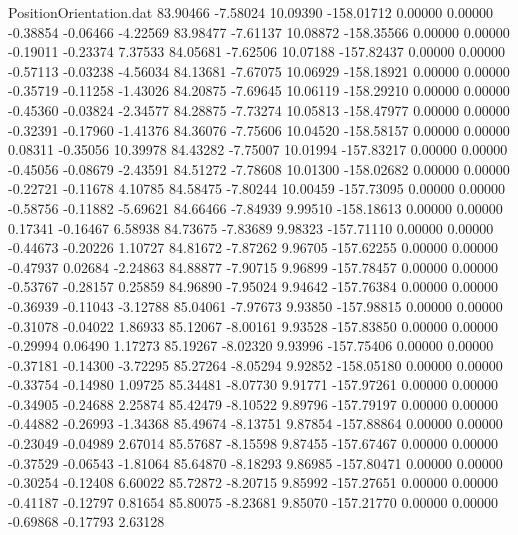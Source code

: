 \begin{filecontents}{PositionOrientation.dat}
  83.90466   -7.58024   10.09390  -158.01712    0.00000    0.00000   -0.38854   -0.06466   -4.22569
  83.98477   -7.61137   10.08872  -158.35566    0.00000    0.00000   -0.19011   -0.23374    7.37533
  84.05681   -7.62506   10.07188  -157.82437    0.00000    0.00000   -0.57113   -0.03238   -4.56034
  84.13681   -7.67075   10.06929  -158.18921    0.00000    0.00000   -0.35719   -0.11258   -1.43026
  84.20875   -7.69645   10.06119  -158.29210    0.00000    0.00000   -0.45360   -0.03824   -2.34577
  84.28875   -7.73274   10.05813  -158.47977    0.00000    0.00000   -0.32391   -0.17960   -1.41376
  84.36076   -7.75606   10.04520  -158.58157    0.00000    0.00000    0.08311   -0.35056   10.39978
  84.43282   -7.75007   10.01994  -157.83217    0.00000    0.00000   -0.45056   -0.08679   -2.43591
  84.51272   -7.78608   10.01300  -158.02682    0.00000    0.00000   -0.22721   -0.11678    4.10785
  84.58475   -7.80244   10.00459  -157.73095    0.00000    0.00000   -0.58756   -0.11882   -5.69621
  84.66466   -7.84939    9.99510  -158.18613    0.00000    0.00000    0.17341   -0.16467    6.58938
  84.73675   -7.83689    9.98323  -157.71110    0.00000    0.00000   -0.44673   -0.20226    1.10727
  84.81672   -7.87262    9.96705  -157.62255    0.00000    0.00000   -0.47937    0.02684   -2.24863
  84.88877   -7.90715    9.96899  -157.78457    0.00000    0.00000   -0.53767   -0.28157    0.25859
  84.96890   -7.95024    9.94642  -157.76384    0.00000    0.00000   -0.36939   -0.11043   -3.12788
  85.04061   -7.97673    9.93850  -157.98815    0.00000    0.00000   -0.31078   -0.04022    1.86933
  85.12067   -8.00161    9.93528  -157.83850    0.00000    0.00000   -0.29994    0.06490    1.17273
  85.19267   -8.02320    9.93996  -157.75406    0.00000    0.00000   -0.37181   -0.14300   -3.72295
  85.27264   -8.05294    9.92852  -158.05180    0.00000    0.00000   -0.33754   -0.14980    1.09725
  85.34481   -8.07730    9.91771  -157.97261    0.00000    0.00000   -0.34905   -0.24688    2.25874
  85.42479   -8.10522    9.89796  -157.79197    0.00000    0.00000   -0.44882   -0.26993   -1.34368
  85.49674   -8.13751    9.87854  -157.88864    0.00000    0.00000   -0.23049   -0.04989    2.67014
  85.57687   -8.15598    9.87455  -157.67467    0.00000    0.00000   -0.37529   -0.06543   -1.81064
  85.64870   -8.18293    9.86985  -157.80471    0.00000    0.00000   -0.30254   -0.12408    6.60022
  85.72872   -8.20715    9.85992  -157.27651    0.00000    0.00000   -0.41187   -0.12797    0.81654
  85.80075   -8.23681    9.85070  -157.21770    0.00000    0.00000   -0.69868   -0.17793    2.63128

\end{filecontents}
